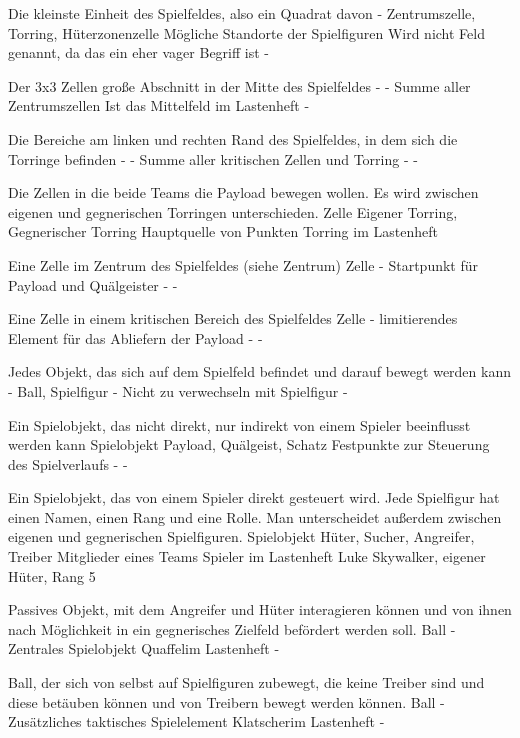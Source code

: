 {Die kleinste Einheit des Spielfeldes, also ein Quadrat davon}
{-}
{Zentrumszelle, Torring, Hüterzonenzelle}
{Mögliche Standorte der Spielfiguren}
{Wird nicht Feld genannt, da das ein eher vager Begriff ist}
{-}

{Der 3x3 Zellen große Abschnitt in der Mitte des Spielfeldes}
{-}
{-}
{Summe aller Zentrumszellen}
{Ist das Mittelfeld im Lastenheft}
{-}

{Die Bereiche am linken und rechten Rand des Spielfeldes, in dem sich die Torringe befinden}
{-}
{-}
{Summe aller kritischen Zellen und Torring}
{-}
{-}

{Die Zellen in die beide Teams die Payload bewegen wollen. Es wird zwischen eigenen und gegnerischen Torringen unterschieden.}
{Zelle}
{Eigener Torring, Gegnerischer Torring}
{Hauptquelle von Punkten}
{Torring im Lastenheft}
{}

{Eine Zelle im Zentrum des Spielfeldes (siehe Zentrum)}
{Zelle}
{-}
{Startpunkt für Payload und Quälgeister}
{-}
{-}

{Eine Zelle in einem kritischen Bereich des Spielfeldes}
{Zelle}
{-}
{limitierendes Element für das Abliefern der Payload}
{-}
{-}

{Jedes Objekt, das sich auf dem Spielfeld befindet und darauf bewegt werden kann}
{-}
{Ball, Spielfigur}
{-}
{Nicht zu verwechseln mit Spielfigur}
{-}

{Ein Spielobjekt, das nicht direkt, nur indirekt von einem Spieler beeinflusst werden kann}
{Spielobjekt}
{Payload, Quälgeist, Schatz}
{Festpunkte zur Steuerung des Spielverlaufs}
{-}
{-}

{Ein Spielobjekt, das von einem Spieler direkt gesteuert wird. Jede Spielfigur hat einen Namen, einen Rang und eine Rolle. Man unterscheidet außerdem zwischen eigenen und gegnerischen Spielfiguren.}
{Spielobjekt}
{Hüter, Sucher, Angreifer, Treiber}
{Mitglieder eines Teams}
{Spieler im Lastenheft}
{Luke Skywalker, eigener Hüter, Rang 5}

{Passives Objekt, mit dem Angreifer und Hüter interagieren können und von ihnen nach Möglichkeit in ein gegnerisches Zielfeld befördert werden soll.}
{Ball}
{-}
{Zentrales Spielobjekt}
{\glqq Quaffel\grqq im Lastenheft}
{-}

{Ball, der sich von selbst auf Spielfiguren zubewegt, die keine Treiber sind und diese betäuben können und von Treibern bewegt werden können.}
{Ball}
{-}
{Zusätzliches taktisches Spielelement}
{\glqq Klatscher\grqq im Lastenheft}
{-}

